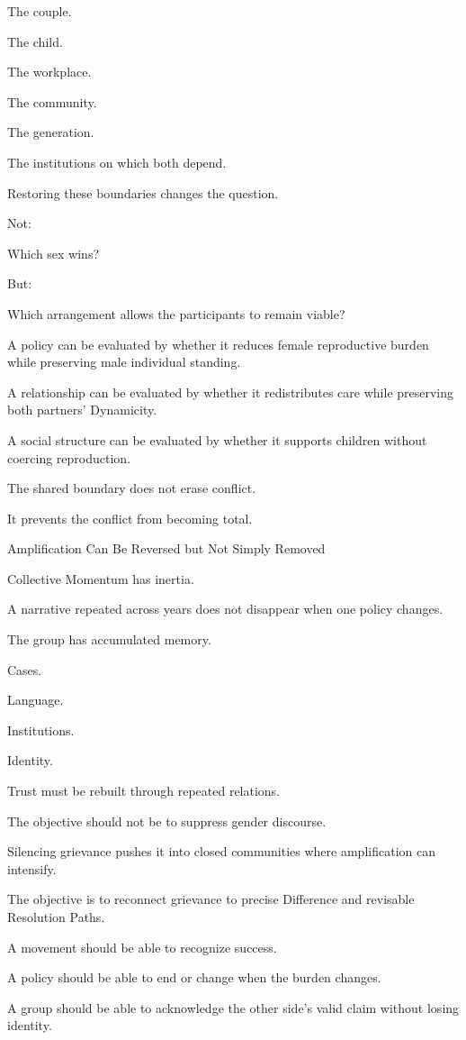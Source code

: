 The couple.

The child.

The workplace.

The community.

The generation.

The institutions on which both depend.

Restoring these boundaries changes the question.

Not:

Which sex wins?

But:

Which arrangement allows the participants to remain viable?

A policy can be evaluated by whether it reduces female reproductive burden while preserving male individual standing.

A relationship can be evaluated by whether it redistributes care while preserving both partners’ Dynamicity.

A social structure can be evaluated by whether it supports children without coercing reproduction.

The shared boundary does not erase conflict.

It prevents the conflict from becoming total.

Amplification Can Be Reversed but Not Simply Removed

Collective Momentum has inertia.

A narrative repeated across years does not disappear when one policy changes.

The group has accumulated memory.

Cases.

Language.

Institutions.

Identity.

Trust must be rebuilt through repeated relations.

The objective should not be to suppress gender discourse.

Silencing grievance pushes it into closed communities where amplification can intensify.

The objective is to reconnect grievance to precise Difference and revisable Resolution Paths.

A movement should be able to recognize success.

A policy should be able to end or change when the burden changes.

A group should be able to acknowledge the other side’s valid claim without losing identity.

